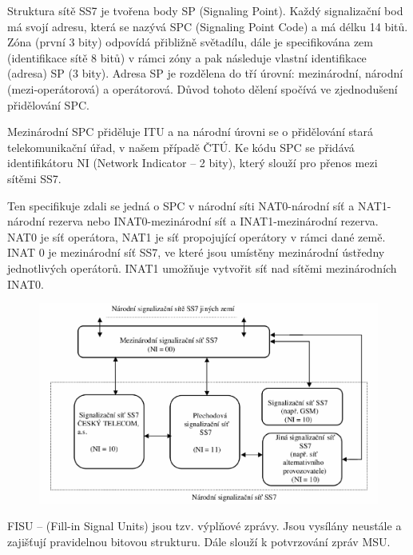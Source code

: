 Struktura sítě SS7 je tvořena body SP (Signaling Point). Každý signalizační bod má svojí adresu, která se nazývá SPC (Signaling Point Code) a má délku 14 bitů. Zóna (první 3 bity) odpovídá přibližně světadílu, dále je specifikována zem (identifikace sítě 8 bitů) v rámci zóny a pak následuje vlastní identifikace (adresa) SP (3 bity). Adresa SP je rozdělena do tří úrovní: mezinárodní, národní (mezi-operátorová) a operátorová. Důvod tohoto dělení spočívá ve zjednodušení přidělování SPC.

Mezinárodní SPC přiděluje ITU a na národní úrovni se o přidělování stará telekomunikační úřad, v našem případě ČTÚ. Ke kódu SPC se přidává identifikátoru NI (Network Indicator -- 2 bity), který slouží pro přenos mezi sítěmi SS7.

Ten specifikuje zdali se jedná o SPC v národní síti NAT0-národní síť a NAT1-národní rezerva nebo INAT0-mezinárodní síť a INAT1-mezinárodní rezerva. NAT0 je síť operátora, NAT1 je síť propojující operátory v rámci dané země. INAT 0 je mezinárodní síť SS7, ve které jsou umístěny mezinárodní ústředny jednotlivých operátorů. INAT1 umožňuje vytvořit síť nad sítěmi mezinárodních INAT0.

\begin{figure}[h!]
    \begin{center}
        \includegraphics[width=\textwidth]{images/otazka19.png}
        \label{img:9}
    \end{center}
\end{figure}


FISU -- (Fill-in Signal Units) jsou tzv. výplňové zprávy. Jsou vysílány neustále a zajišťují pravidelnou bitovou strukturu. Dále slouží k potvrzování zpráv MSU.

